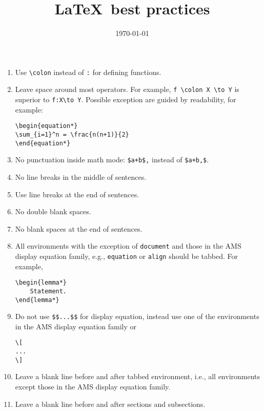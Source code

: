 \documentclass{article}
\begin{document}
	\title{\LaTeX\, best practices}
	\date{\today}
	\maketitle
	
	\begin{enumerate}
		\item Use \verb|\colon| instead of \verb|:| for defining functions.
		\item Leave space around most operators.
		For example, \verb|f \colon X \to Y| is superior to \verb|f:X\to Y|.
		Possible exception are guided by readability, for example:
		
		\verb|\begin{equation*}| \\
		\verb|\sum_{i=1}^n = \frac{n(n+1)}{2}| \\
		\verb|\end{equation*}|
		
		\item No punctuation inside math mode: \verb|$a+b$,| instead of \verb|$a+b,$|.
		\item No line breaks in the middle of sentences.
		\item Use line breaks at the end of sentences.
		\item No double blank spaces.
		\item No blank spaces at the end of sentences.
		\item All environments with the exception of \verb|document| and those in the AMS display equation family, e.g., \verb|equation| or \verb|align| should be tabbed.
		For example,
		
		\verb|\begin{lemma*}| \\
		\verb|    Statement.| \\
		\verb|\end{lemma*}|
		
		\item Do not use \verb|$$...$$| for display equation, instead use one of the environments in the AMS display equation family or
		
		\verb|\[| \\
		\verb|...| \\
		\verb|\]|
		
		\item Leave a blank line before and after tabbed environment, i.e., all environments except those in the AMS display equation family.
		\item Leave a blank line before and after sections and subsections.
		
	\end{enumerate}
\end{document}
